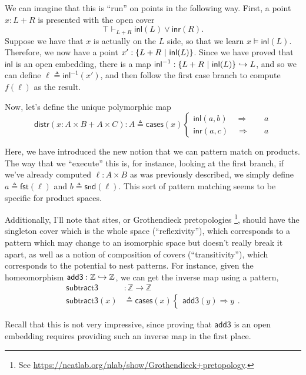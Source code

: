 We can imagine that this is ``run'' on points in the following way. First, a point $x : L + R$ is presented with the open cover
\[
\top \vdash_{L + R} \mathsf{inl}(L) \vee \mathsf{inr}(R).
\]
Suppose we have that $x$ is actually on the $L$ side, so that we learn $x \models \mathsf{inl}(L)$. Therefore, we now have a point $x' : \{ L + R \ |\  \mathsf{inl}(L) \}$. Since we have proved that $\mathsf{inl}$ is an open embedding, there is a map $\mathsf{inl}^{-1} : \{ L + R \ |\  \mathsf{inl}(L) \} \hookrightarrow L$, and so we can define $\ell \triangleq \mathsf{inl}^{-1}(x')$, and then follow the first case branch to compute $f(\ell)$ as the result.

Now, let's define the unique polymorphic map
\[
\mathsf{distr}(x : A \times B + A \times C) : A \triangleq
\mathsf{cases}(x)
  \begin{cases}
  \mathsf{inl}(a, b) \quad \Longrightarrow \quad &a
  \\ \mathsf{inr}(a, c) \quad \Longrightarrow \quad &a
  \end{cases}
\]

Here, we have introduced the new notion that we can pattern match on products. The way that we ``execute'' this is, for instance, looking at the first branch, if we've already computed $\ell : A \times B$ as was previously described, we simply define $a \triangleq \mathsf{fst}(\ell)$ and $b \triangleq \mathsf{snd}(\ell)$. This sort of pattern matching seems to be specific for product spaces.

Additionally, I'll note that sites, or Grothendieck pretopologies \footnote{See \url{https://ncatlab.org/nlab/show/Grothendieck+pretopology}.}, should have the singleton cover which is the whole space (``reflexivity''), which corresponds to a pattern which may change to an isomorphic space but doesn't really break it apart, as well as a notion of composition of covers (``transitivity''), which corresponds to the potential to nest patterns. For instance, given the homeomorphism $\mathsf{add3} : \mathbb{Z} \hookrightarrow \mathbb{Z}$, we can get the inverse map using a pattern,
\begin{align*}
\mathsf{subtract3} &: \mathbb{Z} \to \mathbb{Z}
\\
\mathsf{subtract3}(x) &\triangleq
\mathsf{cases}(x)
\begin{cases}
\mathsf{add3}(y) \Longrightarrow y
\end{cases}.
\end{align*}

Recall that this is not very impressive, since proving that $\mathsf{add3}$ is an open embedding requires providing such an inverse map in the first place.

